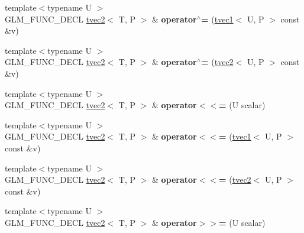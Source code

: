 \begin{DoxyCompactItemize}
{\footnotesize template$<$typename U $>$ }\\G\+L\+M\+\_\+\+F\+U\+N\+C\+\_\+\+D\+E\+CL \hyperlink{structglm_1_1tvec2}{tvec2}$<$ T, P $>$ \& {\bfseries operator$^\wedge$=} (\hyperlink{structglm_1_1tvec1}{tvec1}$<$ U, P $>$ const \&v)
\item 
\mbox{\label{structglm_1_1tvec2_ac1398d1c0dbada005b4ed27a9a568c28}} 
{\footnotesize template$<$typename U $>$ }\\G\+L\+M\+\_\+\+F\+U\+N\+C\+\_\+\+D\+E\+CL \hyperlink{structglm_1_1tvec2}{tvec2}$<$ T, P $>$ \& {\bfseries operator$^\wedge$=} (\hyperlink{structglm_1_1tvec2}{tvec2}$<$ U, P $>$ const \&v)
\item 
\mbox{\label{structglm_1_1tvec2_ab2fe3b9e925a30fea2ceac2b936fc93e}} 
{\footnotesize template$<$typename U $>$ }\\G\+L\+M\+\_\+\+F\+U\+N\+C\+\_\+\+D\+E\+CL \hyperlink{structglm_1_1tvec2}{tvec2}$<$ T, P $>$ \& {\bfseries operator$<$$<$=} (U scalar)
\item 
\mbox{\label{structglm_1_1tvec2_a8f293425e914a1d7964907a89f6b492d}} 
{\footnotesize template$<$typename U $>$ }\\G\+L\+M\+\_\+\+F\+U\+N\+C\+\_\+\+D\+E\+CL \hyperlink{structglm_1_1tvec2}{tvec2}$<$ T, P $>$ \& {\bfseries operator$<$$<$=} (\hyperlink{structglm_1_1tvec1}{tvec1}$<$ U, P $>$ const \&v)
\item 
\mbox{\label{structglm_1_1tvec2_ad02c6fdf1c56884b2a65bf9135a28870}} 
{\footnotesize template$<$typename U $>$ }\\G\+L\+M\+\_\+\+F\+U\+N\+C\+\_\+\+D\+E\+CL \hyperlink{structglm_1_1tvec2}{tvec2}$<$ T, P $>$ \& {\bfseries operator$<$$<$=} (\hyperlink{structglm_1_1tvec2}{tvec2}$<$ U, P $>$ const \&v)
\item 
\mbox{\label{structglm_1_1tvec2_ae86653af46cd2f8f33888f3e720dceb3}} 
{\footnotesize template$<$typename U $>$ }\\G\+L\+M\+\_\+\+F\+U\+N\+C\+\_\+\+D\+E\+CL \hyperlink{structglm_1_1tvec2}{tvec2}$<$ T, P $>$ \& {\bfseries operator$>$$>$=} (U scalar)
\item 
\mbox{\label{structglm_1_1tvec2_a44b9f53542701ce37c0806bc29a7c89c}} 

\end{DoxyCompactItemize}
